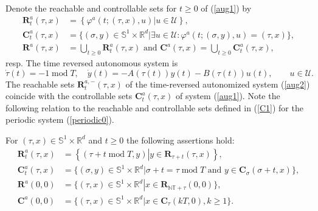 \documentclass{siamltex}%
\begin{document}
Denote the reachable and controllable sets for $t\geq0$ of (\ref{aug1}) by%
\begin{align*}
\mathbf{R}_{t}^{a}(\tau,x)  &  =\left\{  \varphi^{a}(t;(\tau,x),u)\left\vert
u\in\mathcal{U}\right.  \right\}  ,\\
\mathbf{C}_{t}^{a}(\tau,x)  &  =\{(\sigma,y)\in\mathbb{S}^{1}\times
\mathbb{R}^{d}\left\vert \exists u\in\mathcal{U}:\varphi^{a}(t;(\sigma
,y),u)=(\tau,x)\right.  \},\\
\mathbf{R}^{a}(\tau,x)  &  =\bigcup\nolimits_{t\geq0}\mathbf{R}_{t}^{a}%
(\tau,x)\text{ and }\mathbf{C}^{a}(\tau,x)=\bigcup\nolimits_{t\geq0}%
\mathbf{C}_{t}^{a}(\tau,x),
\end{align*}
resp. The time reversed autonomous system is%
\begin{equation}
\dot{\tau}(t)=-1\operatorname{mod}T,\quad\dot{y}(t)=-A(\tau(t))y(t)-B(\tau
(t))u(t),\qquad u\in\mathcal{U}. \label{aug2}%
\end{equation}
The reachable sets $\mathbf{R}_{t}^{a,-}(\tau,x)$ of the time-reversed
autonomized system (\ref{aug2}) coincide with the controllable sets
$\mathbf{C}_{t}^{a}(\tau,x)$ of system (\ref{aug1}). Note the following
relation to the reachable and controllable sets defined in (\ref{C1}) for the
periodic system (\ref{periodic0}).

\begin{lemma}
\label{Lemma3.3}For $(\tau,x)\in\mathbb{S}^{1}\times\mathbb{R}^{d}$ and
$t\geq0$ the following assertions hold:%
\begin{align*}
\mathbf{R}_{t}^{a}(\tau,x)  &  =\left\{  (\tau+t\operatorname{mod}%
T,y)\left\vert y\in\mathbf{R}_{\tau+t}(\tau,x)\right.  \right\}  ,\\
\mathbf{C}_{t}^{a}(\tau,x)  &  =\{(\sigma,y)\in\mathbb{S}^{1}\times
\mathbb{R}^{d}\left\vert \sigma+t=\tau\operatorname{mod}T\text{ and }%
y\in\mathbf{C}_{\sigma}(\sigma+t,x)\right.  \},\\
\mathbf{R}^{a}(0,0)  &  =\{(\tau,x)\in\mathbb{S}^{1}\times\mathbb{R}%
^{d}\left\vert x\in\mathbf{R}_{\mathbb{NT+\tau}}(0,0)\right.  \},\\
\mathbf{C}^{a}(0,0)  &  =\{(\tau,x)\in\mathbb{S}^{1}\times\mathbb{R}%
^{d}\left\vert x\in\mathbf{C}_{\mathbb{\tau}}(kT,0),k\geq1\right.  \}.
\end{align*}

\end{lemma}
\end{document}
